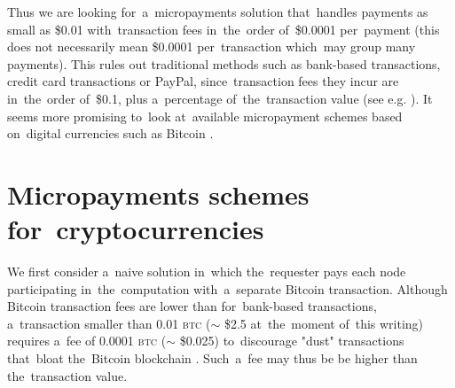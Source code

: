 \documentclass[a4paper]{article}
\newcommand{\BTC}{\textsc{btc}}
\begin{document}
    Thus we are looking for~a~micropayments solution that~handles payments as small as \$0.01 with~transaction fees
    in~the~order of~\$0.0001 per~payment (this does not necessarily mean \$0.0001 per~transaction which~may group many
    payments). This rules out traditional methods such as bank-based transactions, credit card transactions or PayPal,
    since~transaction fees they incur are in~the~order of~\$0.1, plus a~percentage of~the~transaction value
    (see e.g. \cite{FRS}).
    It seems more promising to~look at~available micropayment schemes based on~digital currencies such
    as Bitcoin \cite{BITCOIN}.

\section{Micropayments schemes for~cryptocurrencies}

    We first consider a~naive solution in~which the~requester pays each node participating in~the~computation
    with~a~separate Bitcoin transaction. Although Bitcoin transaction fees are lower than for~bank-based transactions,
    a~transaction smaller than 0.01 \BTC{} ($\sim$ \$2.5 at~the~moment of~this writing) requires a~fee of
    0.0001 \BTC{} ($\sim$ \$0.025) to~discourage "dust" transactions that~bloat the~Bitcoin blockchain \cite{BITFEE}.
    Such~a~fee may thus be be higher than the~transaction value.
\end{document}

